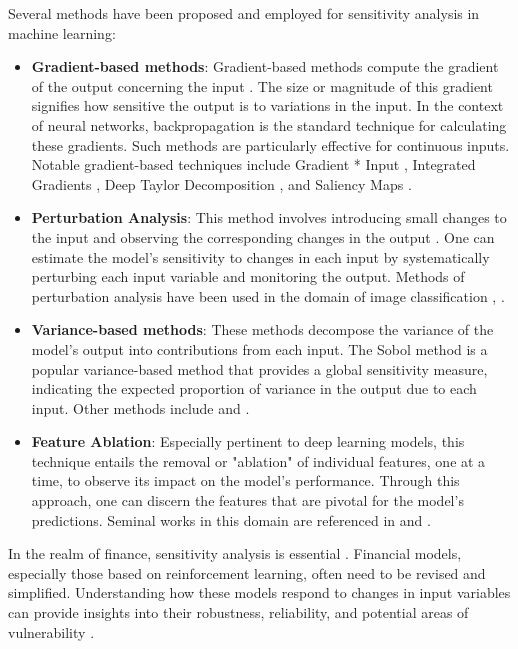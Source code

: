 \documentclass[12pt]{article}
\begin{document}
Several methods have been proposed and employed for sensitivity analysis in machine learning:
\begin{itemize}
    \item \textbf{Gradient-based methods}: Gradient-based methods compute the gradient of the output concerning the input \cite{gradients_tutorial}. The size or magnitude of this gradient signifies how sensitive the output is to variations in the input. In the context of neural networks, backpropagation is the standard technique for calculating these gradients. Such methods are particularly effective for continuous inputs. Notable gradient-based techniques include Gradient * Input \cite{gradients_first}, Integrated Gradients \cite{gradients_IntergratedGradients}, Deep Taylor Decomposition \cite{gradients_Taylor}, and Saliency Maps \cite{gradients_Saliency_Maps}.
    
    \item \textbf{Perturbation Analysis}: This method involves introducing small changes to the input and observing the corresponding changes in the output \cite{PERTURBATION}. One can estimate the model's sensitivity to changes in each input by systematically perturbing each input variable and monitoring the output. Methods of perturbation analysis have been used in the domain of image classification \cite{PERTURBATION1}, \cite{PERTURBATION2}. 
    
    \item \textbf{Variance-based methods}: These methods decompose the variance of the model's output into contributions from each input. The Sobol method \cite{Sobol_sensitivity} is a popular variance-based method that provides a global sensitivity measure, indicating the expected proportion of variance in the output due to each input. Other methods include \cite{Variance_more1} and \cite{Variance_more2}.

   \item \textbf{Feature Ablation}: Especially pertinent to deep learning models, this technique entails the removal or "ablation" of individual features, one at a time, to observe its impact on the model's performance. Through this approach, one can discern the features that are pivotal for the model's predictions. Seminal works in this domain are referenced in \cite{FeatureAblation} and \cite{FeatureAblation_first}.

\end{itemize}

In the realm of finance, sensitivity analysis is essential \cite{SensitivityRL}. Financial models, especially those based on reinforcement learning, often need to be revised and simplified. Understanding how these models respond to changes in input variables can provide insights into their robustness, reliability, and potential areas of vulnerability \cite{UncertantyRL}. 
\end{document}
